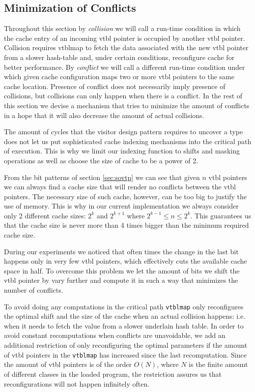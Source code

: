 \documentclass[preprint]{sigplanconf}
\makeatletter
\DeclareRobustCommand{\code}[1]{{\lstinline[breaklines=false,escapechar=@]{#1}}}
\makeatother
\begin{document}
\subsection{Minimization of Conflicts}
\label{sec:moc}

Throughout this section by \emph{collision} we will call a run-time condition in 
which the cache entry of an incoming vtbl pointer is occupied by another vtbl 
pointer. Collision requires vtblmap to fetch the data associated with the new 
vtbl pointer from a slower hash-table and, under certain conditions, reconfigure 
cache for better performance. By \emph{conflict} we will call a different 
run-time condition under which given cache configuration maps two or more vtbl 
pointers to the same cache location. Presence of conflict does not necessarily 
imply presence of collisions, but collisions can only happen when there is a 
conflict. In the rest of this section we devise a mechanism that tries to 
minimize the amount of conflicts in a hope that it will also decrease the amount 
of actual collisions.

The amount of cycles that the visitor design pattern requires to uncover a type 
does not let us put sophisticated cache indexing mechanisms into the critical 
path of execution. This is why we limit our indexing function to shifts and 
masking operations as well as choose the size of cache to be a power of 2.

From the bit patterns of section \textsection\ref{sec:sovtp} we can see that 
given $n$ vtbl pointers we can always find a cache size that will render no 
conflicts between the vtbl pointers. The necessary size of such cache, however, 
can be too big to justify the use of memory. This is why in our current 
implementation we always consider only 2 different cache sizes: $2^k$ and 
$2^{k+1}$ where $2^{k-1} \le n \leq 2^k$. This guarantees us that the cache size 
is never more than 4 times bigger than the minimum required cache size.

During our experiments we noticed that often times the change in the last bit 
happens only in very few vtbl pointers, which effectively cuts the available 
cache space in half. To overcome this problem we let the amount of bits we 
shift the vtbl pointer by vary further and compute it in such a way that 
minimizes the number of conflicts.

To avoid doing any computations in the critical path \code{vtblmap} only 
reconfigures the optimal shift and the size of the cache when an actual collision 
happens: i.e. when it needs to fetch the value from a slower underlain hash 
table. In order to avoid constant recomputations when conflicts are unavoidable, 
we add an additional restriction of only reconfiguring the optimal parameters if 
the amount of vtbl pointers in the \code{vtblmap} has increased since the last 
recomputation. Since the amount of vtbl pointers is of the order $O(N)$, where 
$N$ is the finite amount of different classes in the loaded program, the 
restriction assures us that reconfigurations will not happen infinitely often.
\end{document}
